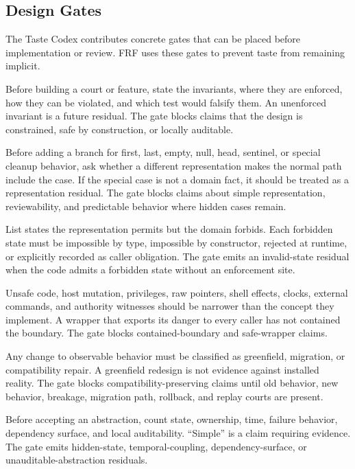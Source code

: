 \documentclass[11pt,a4paper]{article}
\newcommand{\frf}{\textsc{FRF}}
\begin{document}
\subsection{Design Gates}

The Taste Codex contributes concrete gates that can be placed before implementation or review. \frf{} uses these gates to prevent taste from remaining implicit.

\begin{description}[leftmargin=2.7cm,style=nextline]
\item[Invariant ledger.] Before building a court or feature, state the invariants, where they are enforced, how they can be violated, and which test would falsify them. An unenforced invariant is a future residual. The gate blocks claims that the design is constrained, safe by construction, or locally auditable.
\item[Representation check.] Before adding a branch for first, last, empty, null, head, sentinel, or special cleanup behavior, ask whether a different representation makes the normal path include the case. If the special case is not a domain fact, it should be treated as a representation residual. The gate blocks claims about simple representation, reviewability, and predictable behavior where hidden cases remain.
\item[Invalid-state gate.] List states the representation permits but the domain forbids. Each forbidden state must be impossible by type, impossible by constructor, rejected at runtime, or explicitly recorded as caller obligation. The gate emits an invalid-state residual when the code admits a forbidden state without an enforcement site.
\item[Boundary quarantine.] Unsafe code, host mutation, privileges, raw pointers, shell effects, clocks, external commands, and authority witnesses should be narrower than the concept they implement. A wrapper that exports its danger to every caller has not contained the boundary. The gate blocks contained-boundary and safe-wrapper claims.
\item[Compatibility classification.] Any change to observable behavior must be classified as greenfield, migration, or compatibility repair. A greenfield redesign is not evidence against installed reality. The gate blocks compatibility-preserving claims until old behavior, new behavior, breakage, migration path, rollback, and replay courts are present.
\item[Simplicity accounting.] Before accepting an abstraction, count state, ownership, time, failure behavior, dependency surface, and local auditability. ``Simple'' is a claim requiring evidence. The gate emits hidden-state, temporal-coupling, dependency-surface, or unauditable-abstraction residuals.

\end{description}
\end{document}
